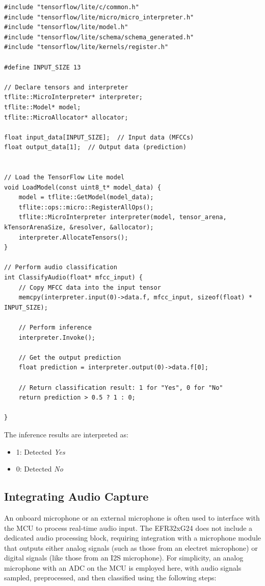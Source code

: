 \documentclass[
  9pt,
  letterpaper,
  abstract,
  titlepage]{scrbook}
\begin{document}
\begin{verbatim}
#include "tensorflow/lite/c/common.h"
#include "tensorflow/lite/micro/micro_interpreter.h"
#include "tensorflow/lite/model.h"
#include "tensorflow/lite/schema/schema_generated.h"
#include "tensorflow/lite/kernels/register.h"

#define INPUT_SIZE 13

// Declare tensors and interpreter
tflite::MicroInterpreter* interpreter;
tflite::Model* model;
tflite::MicroAllocator* allocator;

float input_data[INPUT_SIZE];  // Input data (MFCCs)
float output_data[1];  // Output data (prediction)


// Load the TensorFlow Lite model
void LoadModel(const uint8_t* model_data) {
    model = tflite::GetModel(model_data);
    tflite::ops::micro::RegisterAllOps();
    tflite::MicroInterpreter interpreter(model, tensor_arena, kTensorArenaSize, &resolver, &allocator);
    interpreter.AllocateTensors();
}

// Perform audio classification
int ClassifyAudio(float* mfcc_input) {
    // Copy MFCC data into the input tensor
    memcpy(interpreter.input(0)->data.f, mfcc_input, sizeof(float) * INPUT_SIZE);
    
    // Perform inference
    interpreter.Invoke();

    // Get the output prediction
    float prediction = interpreter.output(0)->data.f[0];

    // Return classification result: 1 for "Yes", 0 for "No"
    return prediction > 0.5 ? 1 : 0;

}
\end{verbatim}

The inference results are interpreted as:

\begin{itemize}
\item
  1: Detected \emph{Yes}
\item
  0: Detected \emph{No}
\end{itemize}

\subsection{Integrating Audio Capture}\label{integrating-audio-capture}

An onboard microphone or an external microphone is often used to
interface with the MCU to process real-time audio input. The EFR32xG24
does not include a dedicated audio processing block, requiring
integration with a microphone module that outputs either analog signals
(such as those from an electret microphone) or digital signals (like
those from an I2S microphone). For simplicity, an analog microphone with
an ADC on the MCU is employed here, with audio signals sampled,
preprocessed, and then classified using the following steps:
\end{document}
